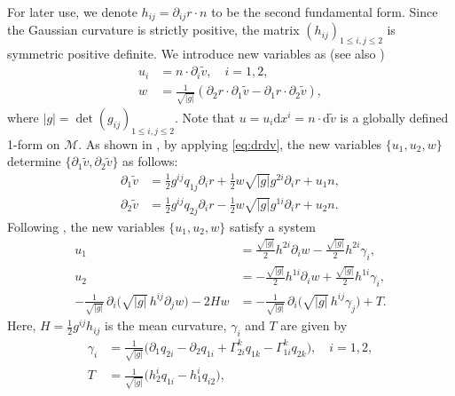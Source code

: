 \documentclass[11pt,a4paper,oneside,reqno]{amsart}
\theoremstyle{definition}
\theoremstyle{plain}
\numberwithin{theorem}{section}
\numberwithin{proposition}{section}
\numberwithin{lemma}{section}
\numberwithin{equation}{section}
\newcommand{\Man}{\mathcal{M}}
\begin{document}
For later use, we denote \( h_{ij} = \partial_{ij} r \cdot n \) to be the second fundamental form. Since the Gaussian curvature is strictly positive, the matrix \( (h_{ij})_{1 \leq i,j \leq 2} \) is symmetric positive definite. We introduce new variables as (see also \cite[(9.2.8-9.2.9)]{han2006isometric})
    \[ \begin{aligned}
        u_i &= n \cdot \partial_i \tilde  v, \quad i = 1,2, \\ 
        w &= \frac{1}{\sqrt{|g|}} 
        (\partial_2 r \cdot \partial_1 \tilde v - \partial_1 r \cdot \partial_2 \tilde  v),
    \end{aligned} \]
    where $|g| = \det (g_{ij})_{1 \leq i,j \leq 2}$. Note that $u= u_i \mathrm{d} x^i = n \cdot \mathrm{d} \tilde  v $ is a globally defined 1-form on $\Man$. 
    As shown in \cite[(9.2.12)]{han2006isometric}, by applying \eqref{eq:drdv}, the new variables \( \{ u_1, u_2, w \} \) determine \( \{ \partial_1 \tilde v, \partial_2 \tilde v \} \) as follows:
    \begin{equation}\label{eq:pv} 
    \begin{aligned}
        \partial_1 \tilde v &=  \frac{1}{2} g^{ij} q_{1j} \partial_i r + 
        \frac{1}{2} w \sqrt{|g|} g^{2i}\partial_i r + u_1 n, 
        \\  
        \partial_2 \tilde v &=  \frac{1}{2} g^{ij} q_{2j} \partial_i r - 
        \frac{1}{2} w \sqrt{|g|} g^{1i}\partial_i r + u_2 n. 
    \end{aligned}
    \end{equation}  
Following \cite[(9.2.17), (9.2.20)]{han2006isometric}, the new variables \( \{ u_1, u_2, w \} \) satisfy a system  
\begin{subequations}\label{eq:u1u2w}  
\begin{align}
\label{eq:u1} 
u_1 &= \frac{\sqrt{|g|}}{2} h^{2i} \partial_i w 
      - \frac{\sqrt{|g|}}{2} h^{2i} \gamma_i, \\
\label{eq:u2}
u_2 &= -\frac{\sqrt{|g|}}{2} h^{1i} \partial_i w 
        + \frac{\sqrt{|g|}}{2} h^{1i} \gamma_i, \\
\label{eq:w}
-\frac{1}{\sqrt{|g|}} \, \partial_i \bigl( \sqrt{|g|} \, h^{ij} \partial_j w \bigr) 
- 2 H w 
&= -\frac{1}{\sqrt{|g|}} \, \partial_i \bigl( \sqrt{|g|} \, h^{ij} \gamma_j \bigr) + T.    
\end{align}
\end{subequations}
Here, $H = \frac{1}{2}g^{ij}h_{ij}$ is the mean curvature, \( \gamma_i \) and \( T \) are given by
\begin{subequations}\label{eq:}  
\begin{align}
\label{eq:ci} 
\gamma_i &= \frac{1}{\sqrt{|g|}}
\big( \partial_1 {q}_{2i} - \partial_2 {q}_{1i}
+ \Gamma^{k}_{2i} {q}_{1k} - \Gamma^{k}_{1i} {q}_{2k} \big), \quad i = 1,2, \\ 
\label{eq:T} 
T &= \frac{1}{\sqrt{|g|}}
\big( h^{i}_{2} {q}_{1i} - h^{i}_{1} {q}_{i2} \big), 
\end{align}
\end{subequations}
\end{document}
